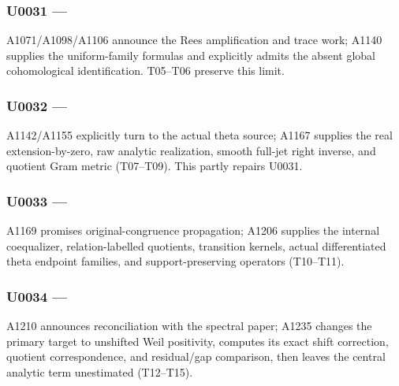 \subsubsection{\texorpdfstring{U0031 ---
\protect{}}{U0031 --- }}\label{TranscriptLedgerStage:u0031-fd1d4ef4-537b-4bca-8d5b-0cb82a441737}

A1071/A1098/A1106 announce the Rees amplification and trace work; A1140
supplies the uniform-family formulas and explicitly admits the absent
global cohomological identification. T05--T06 preserve this limit.

\subsubsection{\texorpdfstring{U0032 ---
\protect{}}{U0032 --- }}\label{TranscriptLedgerStage:u0032-f4609209-f2cd-4dbc-8ec2-a8995aedc998}

A1142/A1155 explicitly turn to the actual theta source; A1167 supplies
the real extension-by-zero, raw analytic realization, smooth full-jet
right inverse, and quotient Gram metric (T07--T09). This partly repairs
U0031.

\subsubsection{\texorpdfstring{U0033 ---
\protect{}}{U0033 --- }}\label{TranscriptLedgerStage:u0033-622780af-97a6-4c56-987c-135df8409461}

A1169 promises original-congruence propagation; A1206 supplies the
internal coequalizer, relation-labelled quotients, transition kernels,
actual differentiated theta endpoint families, and support-preserving
operators (T10--T11).

\subsubsection{\texorpdfstring{U0034 ---
\protect{}}{U0034 --- }}\label{TranscriptLedgerStage:u0034-b5ee7e11-a089-4433-af7a-ede73bbc5bcf}

A1210 announces reconciliation with the spectral paper; A1235 changes
the primary target to unshifted Weil positivity, computes its exact
shift correction, quotient correspondence, and residual/gap comparison,
then leaves the central analytic term unestimated (T12--T15).


